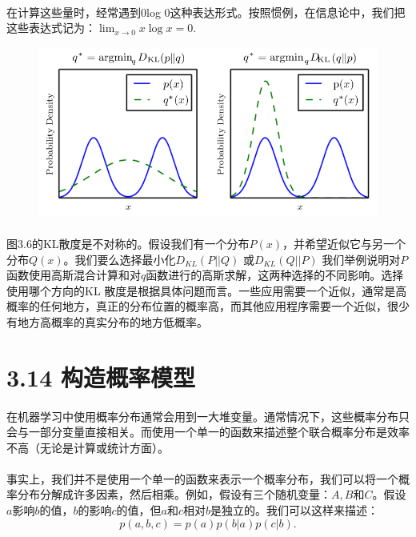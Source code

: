 \documentclass{article}
\begin{document}
  \paragraph{}
  在计算这些量时，经常遇到0log 0这种表达形式。按照惯例，在信息论中，我们把这些表达式记为：$\lim_{x\rightarrow 0}x\log{x}=0$.
  \begin{figure}[!htb]
  \centering
   \centerline{\includegraphics[width=5in]{fig/chap3/3_6.png}}
   \label*{图:3.6}
   \end{figure}
   \paragraph{}
   图3.6的KL散度是不对称的。假设我们有一个分布$P(x)$，并希望近似它与另一个分布$Q(x)$。我们要么选择最小化$D_{KL}(P ||Q)$ 或$D_{KL}(Q||P)$ 我们举例说明对$P$函数使用高斯混合计算和对$q$函数进行的高斯求解，这两种选择的不同影响。选择使用哪个方向的KL 散度是根据具体问题而言。一些应用需要一个近似，通常是高概率的任何地方，真正的分布位置的概率高，而其他应用程序需要一个近似，很少有地方高概率的真实分布的地方低概率。


    \section*{3.14 构造概率模型}
  \paragraph{}
  在机器学习中使用概率分布通常会用到一大堆变量。通常情况下，这些概率分布只会与一部分变量直接相关。而使用一个单一的函数来描述整个联合概率分布是效率不高（无论是计算或统计方面）。
  \paragraph{}
  事实上，我们并不是使用一个单一的函数来表示一个概率分布，我们可以将一个概率分布分解成许多因素，然后相乘。例如，假设有三个随机变量：$A,B$和$C$。假设$a$影响$b$的值，$b$的影响$c$的值，但$a$和$c$相对$b$是独立的。我们可以这样来描述：
  \begin{equation}
   p(a,b,c)= p(a)p(b|a)p(c|b).\tag{3.52}
   \end{equation}
\end{document}
